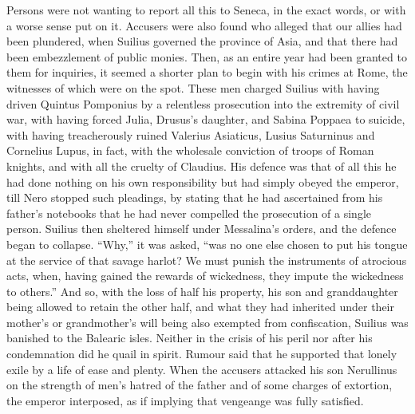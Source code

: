 Persons were not wanting to report all this to Seneca, in the exact words, or with a worse sense put on it. Accusers were also found who alleged that our allies had been plundered, when Suilius governed the province of Asia, and that there had been embezzlement of public monies. Then, as an entire year had been granted to them for inquiries, it seemed a shorter plan to begin with his crimes at Rome, the witnesses of which were on the spot. These men charged Suilius with having driven Quintus Pomponius by a relentless prosecution into the extremity of civil war, with having forced Julia, Drusus's daughter, and Sabina Poppaea to suicide, with having treacherously ruined Valerius Asiaticus, Lusius Saturninus and Cornelius Lupus, in fact, with the wholesale conviction of troops of Roman knights, and with all the cruelty of Claudius. His defence was that of all this he had done nothing on his own responsibility but had simply obeyed the emperor, till Nero stopped such pleadings, by stating that he had ascertained from his father's notebooks that he had never compelled the prosecution of a single person. Suilius then sheltered himself under Messalina's orders, and the defence began to collapse. ``Why,'' it was asked, ``was no one else chosen to put his tongue at the service of that savage harlot? We must punish the instruments of atrocious acts, when, having gained the rewards of wickedness, they impute the wickedness to others.'' And so, with the loss of half his property, his son and granddaughter being allowed to retain the other half, and what they had inherited under their mother's or grandmother's will being also exempted from confiscation, Suilius was banished to the Balearic isles. Neither in the crisis of his peril nor after his condemnation did he quail in spirit. Rumour said that he supported that lonely exile by a life of ease and plenty. When the accusers attacked his son Nerullinus on the strength of men's hatred of the father and of some charges of extortion, the emperor interposed, as if implying that vengeange was fully satisfied.


